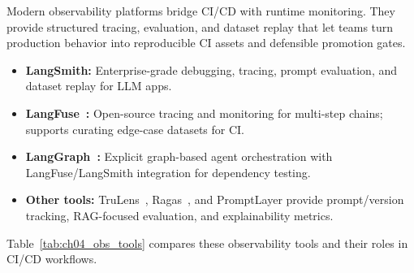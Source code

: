 Modern observability platforms bridge CI/CD with runtime monitoring. They provide structured tracing, evaluation, and dataset replay that let teams turn production behavior into reproducible CI assets and defensible promotion gates.

\begin{tcolorbox}[
  title={\textbf{Observability Platforms for LLM CI/CD}},
  colback=purple!5,
  colframe=purple!40!black,
  colbacktitle=purple!20,
  coltitle=black,
  fonttitle=\bfseries,
  boxrule=0.7pt,
  arc=4pt,
  left=5mm, right=5mm, top=4mm, bottom=4mm,
  before skip=6pt,
  after skip=6pt
]
\begin{itemize}[leftmargin=1.5em, itemsep=4pt, topsep=2pt]
  \item \textbf{LangSmith:} Enterprise-grade debugging, tracing, prompt evaluation, and dataset replay for LLM apps.
  \item \textbf{LangFuse~\cite{langfuse_docs}:} Open-source tracing and monitoring for multi-step chains; supports curating edge-case datasets for CI.
  \item \textbf{LangGraph~\cite{langgraph_docs}:} Explicit graph-based agent orchestration with LangFuse/LangSmith integration for dependency testing.
  \item \textbf{Other tools:} TruLens~\cite{trulens}, Ragas~\cite{ragas_eacl2024}, and PromptLayer provide prompt/version tracking, RAG-focused evaluation, and explainability metrics.
\end{itemize}

Table~\ref{tab:ch04_obs_tools} compares these observability tools and their roles in CI/CD workflows.
\end{tcolorbox}

